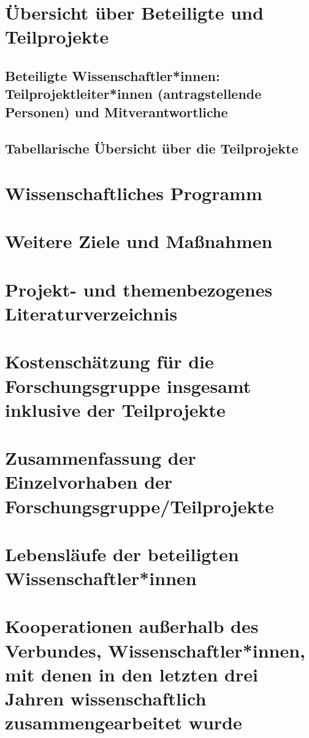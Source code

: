 \documentclass[german, 53.20]{proposal}
\begin{document}
\section{Übersicht über Beteiligte und Teilprojekte}

\subsection{Beteiligte Wissenschaftler*innen: Teilprojektleiter*innen (antragstellende Personen) und Mitverantwortliche}

\subsection{Tabellarische Übersicht über die Teilprojekte}


\section{Wissenschaftliches Programm}


\section{Weitere Ziele und Maßnahmen}


\section{Projekt- und themenbezogenes Literaturverzeichnis}
\printbibliography[heading=none]


\section{Kostenschätzung für die Forschungsgruppe insgesamt inklusive der Teilprojekte}


\section{Zusammenfassung der Einzelvorhaben der Forschungsgruppe/Teilprojekte}


\section{Lebensläufe der beteiligten Wissenschaftler*innen}


\section{Kooperationen außerhalb des Verbundes, Wissenschaftler*innen, mit denen in den letzten drei Jahren wissenschaftlich zusammengearbeitet wurde}
\end{document}
